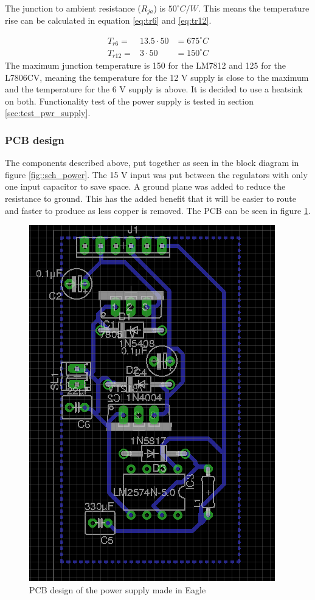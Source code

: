 The junction to ambient resistance ($R_{ja}$) is $50^\circ C/W$\cite{ds:L7806CV,ds:LM78XX}.
This means the temperature rise can be calculated in equation \ref{eq:tr6} and \ref{eq:tr12}.

\begin{eqnarray}
T_{r6}  =&  13.5 \cdot 50   &= 675^\circ C \label{eq:tr6}\\
T_{r12} =&  3 \cdot 50      &= 150^\circ C \label{eq:tr12}
\end{eqnarray}
The maximum junction temperature is 150 for the LM7812\cite[p. 3]{ds:LM78XX} and 125 for the L7806CV\cite[p. 7]{ds:L7806CV}, meaning the temperature for the 12 V supply is close to the maximum and the temperature for the 6 V supply is above.
It is decided to use a heatsink on both.
Functionality test of the power supply is tested in section \ref{sec:test_pwr_supply}.

\subsubsection{PCB design}
The components described above, put together as seen in the block diagram in figure \ref{fig::sch_power}. 
The 15 V input was put between the regulators with only one input capacitor to save space.
A ground plane was added to reduce the resistance to ground.
This has the added benefit that it will be easier to route and faster to produce as less copper is removed.
The PCB can be seen in figure \ref{fig::pcb_power}.

\begin{figure}[ht]
\centering
\includegraphics[angle=90,scale=0.5]{img/pcb_power.png}
\caption{PCB design of the power supply made in Eagle} 
\label{fig::pcb_power}
\end{figure}

